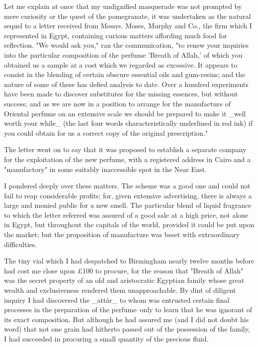 Let me explain at once that my undignified masquerade was not prompted
by mere curiosity or the quest of the pomegranate, it was undertaken
as the natural sequel to a letter received from Messrs. Moses, Murphy
and Co., the firm which I represented in Egypt, containing curious
matters affording much food for reflection. "We would ask you," ran
the communication, "to renew your inquiries into the particular
composition of the perfume 'Breath of Allah,' of which you obtained
us a sample at a cost which we regarded as excessive. It appears to
consist in the blending of certain obscure essential oils and
gum-resins; and the nature of some of these has defied analysis to
date. Over a hundred experiments have been made to discover
substitutes for the missing essences, but without success; and as
we are now in a position to arrange for the manufacture of Oriental
perfume on an extensive scale we should be prepared to make it _well
worth your while_ (the last four words characteristically underlined
in red ink) if you could obtain for us a correct copy of the original
prescription."

The letter went on to say that it was proposed to establish a separate
company for the exploitation of the new perfume, with a registered
address in Cairo and a "manufactory" in some suitably inaccessible
spot in the Near East.

I pondered deeply over these matters. The scheme was a good one and
could not fail to reap considerable profits; for, given extensive
advertising, there is always a large and monied public for a new
smell. The particular blend of liquid fragrance to which the letter
referred was assured of a good sale at a high price, not alone in
Egypt, but throughout the capitals of the world, provided it could
be put upon the market; but the proposition of manufacture was beset
with extraordinary difficulties.

The tiny vial which I had despatched to Birmingham nearly twelve
months before had cost me close upon £100 to procure, for the reason
that "Breath of Allah" was the secret property of an old and
aristocratic Egyptian family whose great wealth and exclusiveness
rendered them unapproachable. By dint of diligent inquiry I had
discovered the _attár_ to whom was entrusted certain final processes
in the preparation of the perfume--only to learn that he was ignorant
of its exact composition. But although he had assured me (and I did
not doubt his word) that not one grain had hitherto passed out of
the possession of the family, I had succeeded in procuring a small
quantity of the precious fluid.

